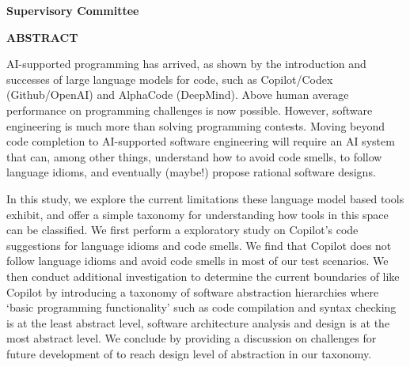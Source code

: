\newpage
{}

\noindent \textbf{Supervisory Committee}
\tpbreak
\panel

\begin{center}
\textbf{ABSTRACT}
\end{center}

AI-supported programming has arrived, as shown by the introduction and successes of large language models for code, such as Copilot/Codex (Github/OpenAI) and AlphaCode (DeepMind). Above human average performance on programming challenges is now possible. However, software engineering is much more than solving programming contests. Moving beyond code completion to AI-supported software engineering will require an AI system that can, among other things, understand how to avoid code smells, to follow language idioms, and eventually (maybe!) propose rational software designs. 

In this study, we explore the current limitations these language model based tools exhibit, and offer a simple taxonomy for understanding how tools in this space can be classified.
We first perform a exploratory study on Copilot's code suggestions for language idioms and code smells. We find that Copilot does not follow language idioms and avoid code smells in most of our test scenarios. We then conduct additional investigation to determine the current boundaries of \cct{} like Copilot by introducing a taxonomy of software abstraction hierarchies where ‘basic programming functionality’ such as code compilation and syntax checking is at the least abstract level, software architecture analysis and design is at the most abstract level.
We conclude by providing a discussion on challenges for future development of \cct{} to reach design level of abstraction in our taxonomy.


